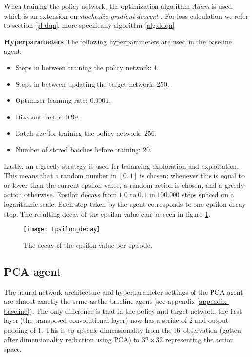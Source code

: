 When training the policy network, the optimization algorithm \emph{Adam} is used, which is an extension on \emph{stochastic gradient descent} \cite{adam}. For loss calculation we refer to section \ref{pl-dqn}, more specifically algorithm \ref{alg:ddqn}.

\noindent\textbf{Hyperparameters}\newline
\noindent The following hyperparameters are used in the baseline agent:
\begin{itemize}
\item Steps in between training the policy network: $4$.
\item Steps in between updating the target network: $250$.
\item Optimizer learning rate: $0.0001$.
\item Discount factor: $0.99$.
\item Batch size for training the policy network: $256$.
\item Number of stored batches before training: $20$.
\end{itemize}

Lastly, an $\epsilon$-greedy strategy is used for balancing exploration and exploitation. This means that a random number in $[0,1]$ is chosen; whenever this is equal to or lower than the current epsilon value, a random action is chosen, and a greedy action otherwise. Epsilon decays from $1.0$ to $0.1$ in $100.000$ steps spaced on a logarithmic scale. Each step taken by the agent corresponds to one epsilon decay step. The resulting decay of the epsilon value can be seen in figure \ref{fig:epsilon}.

\begin{figure}[h]
    \centering
    \texttt{[image: Epsilon\_decay]}
    \caption{The decay of the epsilon value per episode.}
    \label{fig:epsilon}
\end{figure}

\subsection{PCA agent}
The neural network architecture and hyperparameter settings of the PCA agent are almost exactly the same as the baseline agent (see appendix \ref{appendix-baseline}). The only difference is that in the policy and target network, the first layer (the transposed convolutional layer) now has a stride of $2$ and output padding of $1$. This is to upscale dimensionality from the $16 \time 16$ observation (gotten after dimensionality reduction using PCA) to $32 \times 32$ representing the action space.


